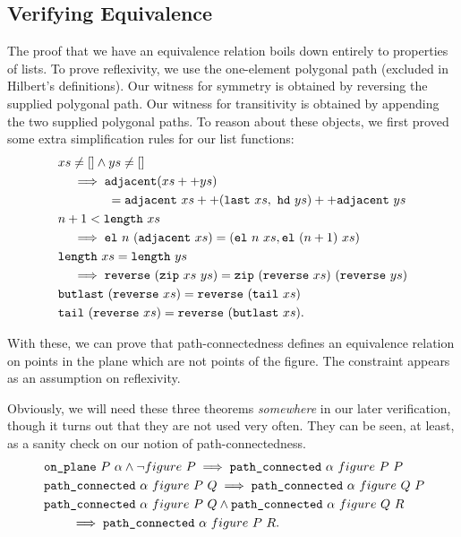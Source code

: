 \subsection{Verifying Equivalence}\label{sec:segConnectEquivalence}
The proof that we have an equivalence relation boils down entirely to properties of lists. To prove reflexivity, we use the one-element polygonal path (excluded in Hilbert's definitions). Our witness for symmetry is obtained by reversing the supplied polygonal path. Our witness for transitivity is obtained by appending the two supplied polygonal paths. To reason about these objects, we first proved some extra simplification rules for our list functions:
\begin{align*}
  &xs \neq [] \wedge ys \neq []\\ 
  &\quad\implies\code{adjacent}(\append{xs}{ys})\\
  &\qquad\qquad = \append{\append{\code{adjacent}\ xs}{(\code{last}\ xs,\ \code{hd}\ ys)}}{\code{adjacent}\ ys}\\
  &n + 1 < \code{length}\ xs\\
  &\quad\implies \el{n}{(\code{adjacent}\ xs)} = (\el{n}{xs}, \el{(n+1)}{xs})\\
  &\code{length}\ xs = \code{length}\ ys\\
  &\quad\implies\code{reverse}\ (\code{zip}\ xs\ ys) = \code{zip}\ (\code{reverse}\ xs)\ (\code{reverse}\ ys)\\
  &\code{butlast}\ (\code{reverse}\ xs) = \code{reverse}\ (\code{tail}\ xs)\\
  &\code{tail}\ (\code{reverse}\ xs) = \code{reverse}\ (\code{butlast}\ xs).
\end{align*}

With these, we can prove that path-connectedness defines an equivalence relation on points in the plane which are not points of the figure. The constraint appears as an assumption on reflexivity. 

Obviously, we will need these three theorems \emph{somewhere} in our later verification, though it turns out that they are not used very often. They can be seen, at least, as a sanity check on our notion of path-connectedness.
\begin{align*}
  \;&\texttt{on\_plane}\ P\ \alpha \wedge \neg figure\ P \implies \texttt{path\_connected}\ \alpha\ figure\ P\ P\\
  \;&\texttt{path\_connected}\ \alpha\ figure\ P\ Q \implies \texttt{path\_connected}\ \alpha\ figure\ Q\ P\\
  \;&\texttt{path\_connected}\ \alpha\ figure\ P\ Q \wedge \texttt{path\_connected}\ \alpha\ figure\ Q\ R\\
  &\qquad\implies \texttt{path\_connected}\ \alpha\ figure\ P\ R.
\end{align*}

